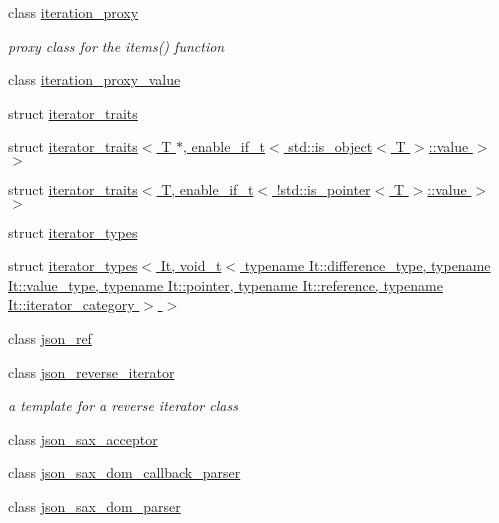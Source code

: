 \begin{DoxyCompactItemize}
class \hyperlink{classnlohmann_1_1detail_1_1iteration__proxy}{iteration\+\_\+proxy}
\begin{DoxyCompactList}\small\item\em proxy class for the items() function \end{DoxyCompactList}\item 
class \hyperlink{classnlohmann_1_1detail_1_1iteration__proxy__value}{iteration\+\_\+proxy\+\_\+value}
\item 
struct \hyperlink{structnlohmann_1_1detail_1_1iterator__traits}{iterator\+\_\+traits}
\item 
struct \hyperlink{structnlohmann_1_1detail_1_1iterator__traits_3_01T_01_5_00_01enable__if__t_3_01std_1_1is__object_3_01T_01_4_1_1value_01_4_01_4}{iterator\+\_\+traits$<$ T $\ast$, enable\+\_\+if\+\_\+t$<$ std\+::is\+\_\+object$<$ T $>$\+::value $>$ $>$}
\item 
struct \hyperlink{structnlohmann_1_1detail_1_1iterator__traits_3_01T_00_01enable__if__t_3_01_9std_1_1is__pointer_3_01T_01_4_1_1value_01_4_01_4}{iterator\+\_\+traits$<$ T, enable\+\_\+if\+\_\+t$<$ !std\+::is\+\_\+pointer$<$ T $>$\+::value $>$ $>$}
\item 
struct \hyperlink{structnlohmann_1_1detail_1_1iterator__types}{iterator\+\_\+types}
\item 
struct \hyperlink{structnlohmann_1_1detail_1_1iterator__types_3_01It_00_01void__t_3_01typename_01It_1_1difference_d2be8685966c97e00e99d4fd2366dc0b}{iterator\+\_\+types$<$ It, void\+\_\+t$<$ typename It\+::difference\+\_\+type, typename It\+::value\+\_\+type, typename It\+::pointer, typename It\+::reference, typename It\+::iterator\+\_\+category $>$ $>$}
\item 
class \hyperlink{classnlohmann_1_1detail_1_1json__ref}{json\+\_\+ref}
\item 
class \hyperlink{classnlohmann_1_1detail_1_1json__reverse__iterator}{json\+\_\+reverse\+\_\+iterator}
\begin{DoxyCompactList}\small\item\em a template for a reverse iterator class \end{DoxyCompactList}\item 
class \hyperlink{classnlohmann_1_1detail_1_1json__sax__acceptor}{json\+\_\+sax\+\_\+acceptor}
\item 
class \hyperlink{classnlohmann_1_1detail_1_1json__sax__dom__callback__parser}{json\+\_\+sax\+\_\+dom\+\_\+callback\+\_\+parser}
\item 
class \hyperlink{classnlohmann_1_1detail_1_1json__sax__dom__parser}{json\+\_\+sax\+\_\+dom\+\_\+parser}

\end{DoxyCompactItemize}

